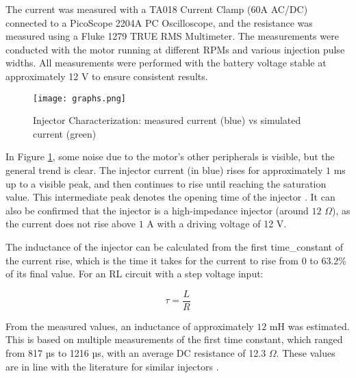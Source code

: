     The current was measured with a TA018 Current Clamp (60A AC/DC) connected to a PicoScope 2204A PC Oscilloscope, and the resistance was measured using a Fluke 1279 TRUE RMS Multimeter. The measurements were conducted with the motor running at different RPMs and various injection pulse widths. All measurements were performed with the battery voltage stable at approximately 12 V to ensure consistent results.


    \begin{figure}
        \centering
        \texttt{[image: graphs.png]}
        \caption{Injector Characterization: measured current (blue) vs simulated current (green)}
        \label{fig:injector_characterization}
    \end{figure}

    In Figure \ref{fig:injector_characterization}, some noise due to the motor's other peripherals is visible, but the general trend is clear. The injector current (in blue) rises for approximately $1$ ms up to a visible peak, and then continues to rise until reaching the saturation value. This intermediate peak denotes the opening time of the injector \autocite{wieclawskiElectricCurrentWaveform2020}. It can also be confirmed that the injector is a high-impedance injector (around $12$ $\Omega$), as the current does not rise above $1$ A with a driving voltage of 12 V.

    The inductance of the injector can be calculated from the first \gls{time_constant} of the current rise, which is the time it takes for the current to rise from 0 to 63.2\% of its final value. For an RL circuit with a step voltage input:
    
    \begin{equation}
        \tau = \frac{L}{R} 
    \end{equation}
    
    From the measured values, an inductance of approximately $12$ mH was estimated. This is based on multiple measurements of the first time constant, which ranged from 817 µs to 1216 µs, with an average DC resistance of 12.3 $\Omega$. These values are in line with the literature for similar injectors \autocite{wieclawskiElectricCurrentWaveform2020} \autocite{texasinstrumentsLM1949InjectorDrive1995} \autocite{linearProductsDatasheet}.

